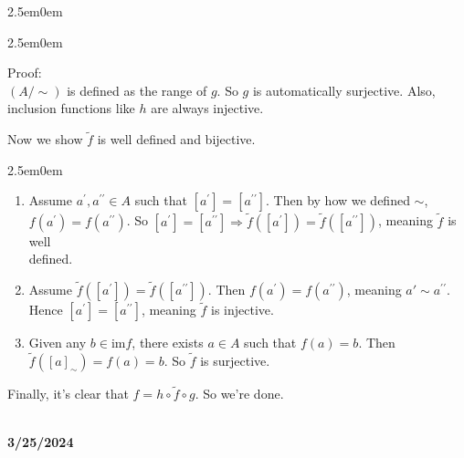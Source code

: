 \documentclass{book}
\newcommand{\hThree}{%
   \color{PineGreen!85!Orange}
   \fontsize{13}{15}\selectfont%
}
\newcommand{\hFour}{%
   \color{Cerulean}
   \fontsize{12}{14}\selectfont%
}
\newenvironment{myIndent}{%
   \begin{adjustwidth}{2.5em}{0em}%
}{%
   \end{adjustwidth}%
}
\newcommand*{\markDate}[1]{%
   {\huge \color{Black} \textbf{#1} \newline}%
}
\newcommand{\pprime}{{\prime\prime}}
\newcommand{\myIm}{\mathrm{im}}
\newcommand{\mySepTwo}[1][.]{%
   {\noindent\color{#1}{\rule{6.5in}{0.5mm}}}\\%
}
\newcommand{\retTwo}{\hfill\bigbreak}
\begin{document}
{\begin{myIndent}
      {\begin{myIndent} \hThree
         Proof:\\
         $(A/{\sim})$ is defined as the range of $g$. So $g$ is automatically surjective. Also,\\ inclusion functions like $h$ are always injective.\retTwo

         Now we show $\widetilde{f}$ is well defined and bijective.
         {\begin{myIndent} \hFour
            \begin{enumerate}
               \item Assume $a^\prime, a^\pprime \in A$ such that $[a^\prime] = [a^\pprime]$. Then by how we defined $\sim$,\\ $f(a^\prime) = f(a^\pprime)$. So $[a^\prime] = [a^\pprime] \Longrightarrow \widetilde{f}([a^\prime]) = \widetilde{f}([a^\pprime])$, meaning $\widetilde{f}$ is well\\ defined.
               
               \newpage

               \item Assume $\widetilde{f}([a^\prime]) = \widetilde{f}([a^\pprime])$. Then $f(a^\prime) = f(a^\pprime)$, meaning $a' \sim a^\pprime$.\\ Hence $[a^\prime] = [a^\pprime]$, meaning  $\widetilde{f}$ is injective.\\
               
               \item Given any $b \in \myIm f$, there exists $a \in A$ such that $f(a) = b$. Then\\ $\widetilde{f}([a]_\sim) = f(a) = b$. So $\widetilde{f}$ is surjective.\retTwo
            \end{enumerate}
         \end{myIndent}}

         Finally, it's clear that $f = h \circ \widetilde{f} \circ g$. So we're done.
      \end{myIndent}}
   \end{myIndent}}

   \mySepTwo

   \markDate{3/25/2024}
\end{document}
